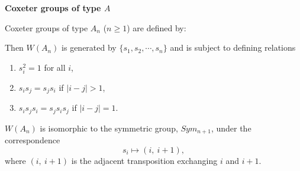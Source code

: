 \documentclass[9pt,handout]{beamer}
\begin{document}
\begin{frame}{\textbf{Coxeter groups of type $A$}}

Coxeter groups of type $A_{n}$ ($n\geq 1$) are defined by:
\begin{figure}
\end{figure}

\pause
 
Then $W(A_{n})$ is generated by $\{s_{1}, s_{2}, \cdots, 
s_{n}\}$ and is subject to defining relations
\begin{enumerate}
\item $s_{i}^{2}=1$ for all $i$,
\item $s_{i}s_{j}=s_{j}s_{i}$ if $|i-j|>1$,
\item $s_{i}s_{j}s_{i}=s_{j}s_{i}s_{j}$ if $|i-j|=1$.
\end{enumerate}
\pause 
$W(A_{n})$ is isomorphic to the symmetric group, $Sym_{n+1}$, under 
the correspondence 
\[
s_{i}\mapsto (i,\ i+1),
\]
where $(i,\ i+1)$ is the adjacent transposition exchanging $i$ and $i+1$.

\end{frame}

\end{document}
